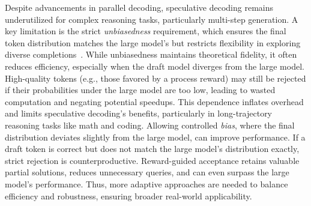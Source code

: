\documentclass{article}
\theoremstyle{plain}
\theoremstyle{definition}
\theoremstyle{remark}
\begin{document}
Despite advancements in parallel decoding, speculative decoding remains underutilized for complex reasoning tasks, particularly multi-step generation. A key limitation is the strict \emph{unbiasedness} requirement, which ensures the final token distribution matches the large model's but restricts flexibility in exploring diverse completions~\cite{Holtzman2019}.  While unbiasedness maintains theoretical fidelity, it often reduces efficiency, especially when the draft model diverges from the large model. High-quality tokens (e.g., those favored by a process reward) may still be rejected if their probabilities under the large model are too low, leading to wasted computation and negating potential speedups. This dependence inflates overhead and limits speculative decoding's benefits, particularly in long-trajectory reasoning tasks like math and coding.  
Allowing controlled \emph{bias}, where the final distribution deviates slightly from the large model, can improve performance. If a draft token is correct but does not match the large model's distribution exactly, strict rejection is counterproductive. Reward-guided acceptance retains valuable partial solutions, reduces unnecessary queries, and can even surpass the large model's performance. Thus, more adaptive approaches are needed to balance efficiency and robustness, ensuring broader real-world applicability.
\end{document}
